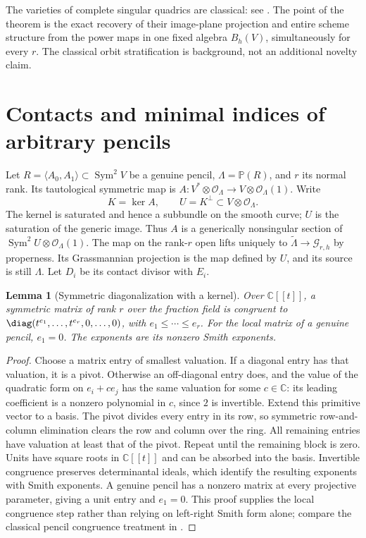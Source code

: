 \documentclass[11pt,reqno]{amsart}
\numberwithin{equation}{section}
\newtheorem{lemma}[theorem]{Lemma}
\theoremstyle{definition}\newtheorem{definition}[theorem]{Definition}
\theoremstyle{remark}\newtheorem{remark}[theorem]{Remark}
\newcommand{\C}{\mathbb C}\newcommand{\Q}{\mathbb Q}
\newcommand{\Pj}{\mathbb P}\newcommand{\A}{\mathbb A}
\newcommand{\OO}{\mathcal O}\newcommand{\II}{\mathcal I}
\DeclareMathOperator{\Sym}{Sym}\DeclareMathOperator{\Gr}{Gr}
\begin{document}
The varieties of complete singular quadrics are classical: see
\cite[Definition~2.5, Remark~2.6 and Theorem~2.14]{CasarottiCornianiMassarenti2023}.
The point of the theorem is the exact recovery of their image-plane
projection and entire scheme structure from the power maps in one
fixed algebra $B_h(V)$, simultaneously for every $r$. The classical
orbit stratification is background, not an additional novelty claim.


\section{Contacts and minimal indices of arbitrary pencils}
\label{sec:singular-pencil-v158}
Let $R=\langle A_0,A_1\rangle\subset\Sym^2V$ be a genuine pencil,
$\Lambda=\Pj(R)$, and $r$ its normal rank. Its tautological symmetric
map is $A:V^*\otimes\OO_\Lambda\to V\otimes\OO_\Lambda(1)$.
Write
\[
 K=\ker A,\qquad U=K^\perp\subset V\otimes\OO_\Lambda.
\]
The kernel is saturated and hence a subbundle on the smooth curve;
$U$ is the saturation of the generic image. Thus $A$ is a generically
nonsingular section of $\Sym^2U\otimes\OO_\Lambda(1)$.
The map on the rank-$r$ open lifts uniquely to
$\widetilde\Lambda\to\mathcal G_{r,h}$ by properness. Its
Grassmannian projection is the map defined by $U$, and its source is
still $\Lambda$. Let $D_i$ be its contact divisor with $E_i$.

\begin{lemma}[Symmetric diagonalization with a kernel]
\label{lem:symmetric-dvr-v158}
Over $\C[[t]]$, a symmetric matrix of rank $r$ over the fraction field
is congruent to $\diag(t^{e_1},\ldots,t^{e_r},0,\ldots,0)$, with
$e_1\leq\cdots\leq e_r$. For the local matrix of a genuine pencil,
$e_1=0$. The exponents are its nonzero Smith exponents.
\end{lemma}
\begin{proof}
Choose a matrix entry of smallest valuation. If a diagonal entry
has that valuation, it is a pivot. Otherwise an off-diagonal entry
does, and the value of the quadratic form on $e_i+c e_j$ has the
same valuation for some $c\in\C$: its leading coefficient is a
nonzero polynomial in $c$, since $2$ is invertible. Extend this
primitive vector to a basis. The pivot divides every entry in its
row, so symmetric row-and-column elimination clears the row and
column over the ring. All remaining entries have valuation at least
that of the pivot. Repeat until the remaining block is zero.
Units have square roots in $\C[[t]]$ and can be absorbed into the
basis. Invertible congruence preserves determinantal ideals, which
identify the resulting exponents with Smith exponents. A genuine
pencil has a nonzero matrix at every projective parameter, giving a
unit entry and $e_1=0$. This proof supplies the local congruence step
rather than relying on left-right Smith form alone; compare the
classical pencil congruence treatment in \cite{Thompson1991}.
\end{proof}
\end{document}
